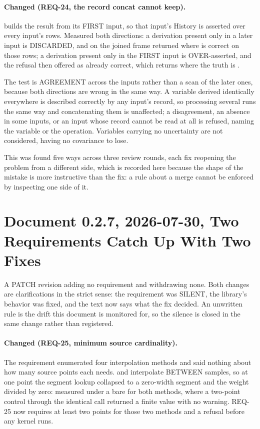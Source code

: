 \paragraph{Changed (REQ-24, the record concat cannot keep).}
 builds the result from its FIRST input, so that
input's History is asserted over every input's rows. Measured both
directions: a derivation present only in a later input is DISCARDED, and
 on the joined frame returned
 where  is correct on those rows; a
derivation present only in the FIRST input is OVER-asserted, and the
refusal then offered  as already correct, which
returns \code{[0, 0]} where the truth is \code{[0, 97]}.

The test is AGREEMENT across the inputs rather than a scan of the later
ones, because both directions are wrong in the same way. A variable
derived identically everywhere is described correctly by any input's
record, so processing several runs the same way and concatenating them
is unaffected; a disagreement, an absence in some inputs, or an input
whose record cannot be read at all is refused, naming the variable or
the operation. Variables carrying no uncertainty are not considered,
having no covariance to lose.

This was found five ways across three review rounds, each fix reopening
the problem from a different side, which is recorded here because the
shape of the mistake is more instructive than the fix: a rule about a
merge cannot be enforced by inspecting one side of it.

\section*{Document 0.2.7, 2026-07-30, Two Requirements Catch Up With Two Fixes}

A PATCH revision adding no requirement and withdrawing none. Both changes
are clarifications in the strict sense: the requirement was SILENT, the
library's behavior was fixed, and the text now says what the fix decided.
An unwritten rule is the drift this document is monitored for, so the
silence is closed in the same change rather than registered.

\paragraph{Changed (REQ-25, minimum source cardinality).} The requirement
enumerated four interpolation methods and said nothing about how many
source points each needs.  and  interpolate
BETWEEN samples, so at one point the segment lookup collapsed to a
zero-width segment and the weight divided by zero: measured  under a bare  for both methods, where a
two-point control through the identical call returned a finite value
with no warning. REQ-25 now requires at least two points for those two
methods and a refusal before any kernel runs.

